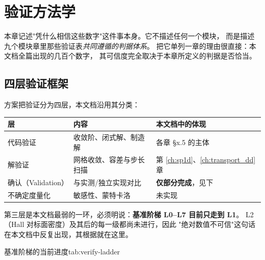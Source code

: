 
\chapter{验证方法学}
\label{ch:verification-methodology}

本章记述"凭什么相信这些数字"这件事本身。它不描述任何一个模块，
而是描述九个模块章里那些验证表\emph{共同遵循的判据体系}。
把它单列一章的理由很直接：本文档全篇出现的几百个数字，
其可信度完全取决于本章所定义的判据是否恰当。

\section{四层验证框架}
\label{sec:verify-framework}

方案把验证分为四层，本文档沿用其分类：

\begin{center}
\small
\begin{tabular}{@{}p{} p{} p{}@{}}
\toprule
\textbf{层} & \textbf{内容} & \textbf{本文档中的体现}\\
\midrule
代码验证 & 收敛阶、闭式解、制造解 & 各章 §x.5 的主体\\
解验证 & 网格收敛、容差与步长扫描 & 第 \ref{ch:sp1d}、\ref{ch:transport_dd} 章\\
确认（Validation） & 与实测/独立实现对比 & \textbf{仅部分完成}，见下\\
不确定度量化 & 敏感性、蒙特卡洛 & 未实现\\
\bottomrule
\end{tabular}
\end{center}

第三层是本文档最弱的一环，必须明说：\textbf{基准阶梯 L0--L7 目前只走到 L1}。
L2（Hall 对标面密度）及其后的每一级都尚未进行，因此
"绝对数值不可信"这句话在本文档中反复出现，其根据就在这里。

\begin{veriftable}{基准阶梯的当前进度}{tab:verify-ladder}
\end{veriftable}

